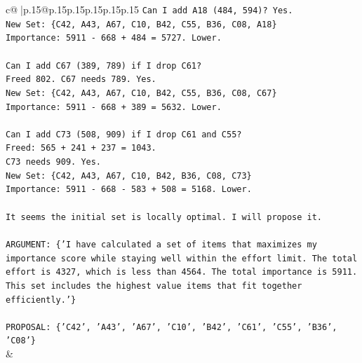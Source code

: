 \documentclass{article}
\begin{document}
{\begin{supertabular}{c@{$\;$}|p{.15\linewidth}@{}p{.15\linewidth}p{.15\linewidth}p{.15\linewidth}p{.15\linewidth}p{.15\linewidth}}
{{{\texttt{Can I add A18 (484, 594)? Yes.} \\
\texttt{New Set: \{C42, A43, A67, C10, B42, C55, B36, C08, A18\}} \\
\texttt{Importance: 5911 {-} 668 + 484 = 5727. Lower.} \\
\\ 
\texttt{Can I add C67 (389, 789) if I drop C61?} \\
\texttt{Freed 802. C67 needs 789. Yes.} \\
\texttt{New Set: \{C42, A43, A67, C10, B42, C55, B36, C08, C67\}} \\
\texttt{Importance: 5911 {-} 668 + 389 = 5632. Lower.} \\
\\ 
\texttt{Can I add C73 (508, 909) if I drop C61 and C55?} \\
\texttt{Freed: 565 + 241 + 237 = 1043.} \\
\texttt{C73 needs 909. Yes.} \\
\texttt{New Set: \{C42, A43, A67, C10, B42, B36, C08, C73\}} \\
\texttt{Importance: 5911 {-} 668 {-} 583 + 508 = 5168. Lower.} \\
\\ 
\texttt{It seems the initial set is locally optimal. I will propose it.} \\
\\ 
\texttt{ARGUMENT: \{'I have calculated a set of items that maximizes my importance score while staying well within the effort limit. The total effort is 4327, which is less than 4564. The total importance is 5911. This set includes the highest value items that fit together efficiently.'\}} \\
\\ 
\texttt{PROPOSAL: \{'C42', 'A43', 'A67', 'C10', 'B42', 'C61', 'C55', 'B36', 'C08'\}} \\
            }
        }
    }
    & \\ \\


\end{supertabular}}
\end{document}

